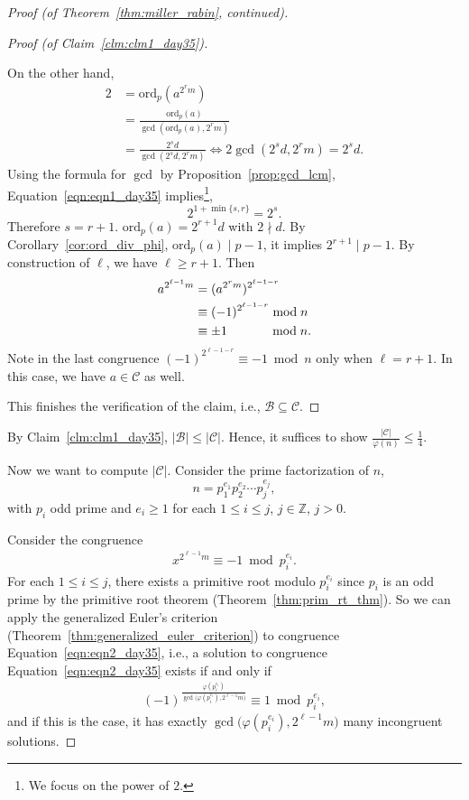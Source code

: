 \documentclass{amsbook}
\theoremstyle{plain}
\theoremstyle{definition}
\theoremstyle{remark}
\numberwithin{equation}{chapter}
\numberwithin{figure}{chapter}
\newcommand{\Z}{\mathbb{Z}}
\newcommand{\sB}{\mathcal{B}}
\newcommand{\sC}{\mathcal{C}}
\newcommand*{\ord}{\text{ord}}
\begin{document}
\begin{proof}[Proof {\rm (of Theorem~\ref{thm:miller_rabin}, continued)}]
\begin{proof}[Proof {\rm (of Claim~\ref{clm:clm1_day35})}]
\begin{enumerate}[label=(\roman*)]
    On the other hand,
    \begin{align}
      2 &= \ord_p (a^{2^r m}) \\
        &= \frac{\ord_p (a)}{\gcd (\ord_p (a), 2^r m)} \\
        &= \frac{2^s d}{\gcd (2^s d, 2^r m)} \iff  2 \gcd (2^s d, 2^r m) = 2^s d. \label{eqn:eqn1_day35} 
    \end{align}
    Using the formula for $\gcd$ by Proposition~\ref{prop:gcd_lcm}, Equation~\eqref{eqn:eqn1_day35} implies\footnote{We focus on the power of $2$.},
    \[
      2^{1 + \min \{ s, r \}} = 2^s.
    \]
    Therefore $s = r+1$. $\ord_p (a) = 2^{r+1} d$ with $2 \nmid d$.
    By Corollary~\ref{cor:ord_div_phi}, $\ord_p (a) \mid p - 1$, it implies $2^{r+1} \mid p - 1$. By construction of $\ell$, we have $\ell \geqslant r + 1$. Then
    \begin{align}
      a^{2^{\ell - 1}m} &= (a^{2^r m})^{2^{\ell - 1 - r}} \\
                        &\equiv (-1)^{2^{\ell - 1 - r}} \bmod n \\
                        &\equiv \pm 1 \hspace{11.7mm}\bmod n.
    \end{align}
    Note in the last congruence $(-1)^{2^{\ell - 1 - r}} \equiv -1 \bmod n $ only when $\ell = r+1$.
    In this case, we have $a \in \sC$ as well.
  \end{enumerate}
  This finishes the verification of the claim, i.e., $\sB \subseteq \sC$.
\end{proof}
By Claim~\ref{clm:clm1_day35}, $\vert \sB \vert \leqslant \vert \sC \vert$. Hence, it suffices to show $\frac{\vert \sC \vert}{\varphi (n)} \leqslant \frac{1}4$.

Now we want to compute $\vert \sC \vert$. Consider the prime factorization of $n$,
\[
  n = p_1^{e_1}p_2^{e_2} \cdots p_j^{e_j},
\]
with $p_i$ odd prime and $e_i \geqslant 1$ for each $1 \leqslant i \leqslant j$, $j \in \Z$, $j > 0$.

Consider the congruence
\begin{align}
  x^{2^{\ell - 1}m} \equiv -1 \bmod p_i^{e_i}. \label{eqn:eqn2_day35}
\end{align}
For each $1 \leqslant i \leqslant j$, there exists a primitive root modulo $p_i^{e_i}$ since $p_i$ is an odd prime by the primitive root theorem (Theorem~\ref{thm:prim_rt_thm}). So we can apply the generalized Euler's criterion (Theorem~\ref{thm:generalized_euler_criterion}) to congruence Equation~\eqref{eqn:eqn2_day35}, i.e., a solution to congruence Equation~\eqref{eqn:eqn2_day35} exists if and only if 
\begin{align}
(-1)^{\displaystyle \frac{\varphi (p_i^{e_i})}{\gcd \big(\varphi (p_i^{e_i}), 2^{\ell - 1}m\big)}} \equiv 1 \bmod p_i^{e_i}, \label{eqn:eqn3_day35}
\end{align}
and if this is the case, it has exactly $\gcd \big(\varphi (p_i^{e_i}), 2^{\ell - 1}m \big)$ many incongruent solutions. 


\end{proof}
\end{document}
